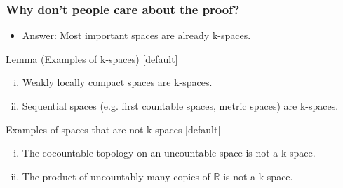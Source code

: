 \documentclass{beamer}
\newcommand{\R}{\mathbb{R}}
\begin{document}
\begin{frame}
\frametitle{Why don't people care about the proof?}
  \begin{itemize}
    \item Answer: Most important spaces are already k-spaces.
  \end{itemize}
  \begin{block}{Lemma (Examples of k-spaces)}
    [default]
    \begin{enumerate}[(i)]
      \item Weakly locally compact spaces are k-spaces.
      \item Sequential spaces (e.g. first countable spaces, metric spaces) are k-spaces.
    \end{enumerate}
  \end{block}
  \begin{block}{Examples of spaces that are not k-spaces}
    [default]
    \begin{enumerate}[(i)]
      \item The cocountable topology on an uncountable space is not a k-space.
      \item The product of uncountably many copies of $\R$ is not a k-space.
    \end{enumerate}
  \end{block}
\end{frame}
\end{document}
